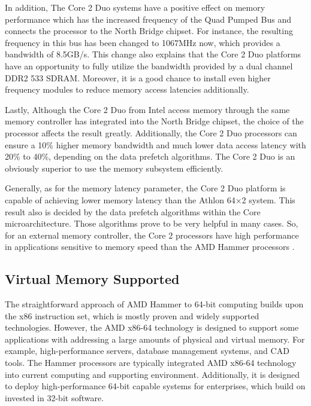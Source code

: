 \documentclass[letterpaper,10pt,compsoc,draftclsnofoot,onecolumn]{IEEEtran}
\begin{document}
In addition, The Core 2 Duo systems have a positive effect on memory performance which has the increased frequency of the Quad Pumped Bus\cite{pdf_amd_mem} and connects the processor to the North Bridge chipset. For instance, the resulting frequency in this bus has been changed to 1067MHz now, which provides a bandwidth of 8.5GB/s. This change also explains that the Core 2 Duo platforms have an opportunity to fully utilize the bandwidth provided by a dual channel DDR2 533 SDRAM. Moreover, it is a good chance to install even higher frequency modules to reduce memory access latencies additionally.

Lastly, Although the Core 2 Duo from Intel access memory through the same memory controller has integrated into the North Bridge chipset, the choice of the processor affects the result greatly. Additionally, the Core 2 Duo processors can ensure a 10\% higher memory bandwidth and much lower data access latency with 20\% to 40\%\cite{pdf_amd_mem}, depending on the data prefetch algorithms. The Core 2 Duo is an obviously superior to use the memory subsystem efficiently.

Generally, as for the memory latency parameter, the Core 2 Duo platform is capable of achieving lower memory latency than the Athlon 64×2 system. This result also is decided by the data prefetch algorithms within the Core microarchitecture. Those algorithms prove to be very helpful in many cases. So, for an external memory controller, the Core 2 processors have high performance in applications sensitive to memory speed than the AMD Hammer processors .

\subsection{Virtual Memory Supported}
The straightforward approach of AMD Hammer to 64-bit computing builds upon the x86 instruction set, which is mostly proven and widely supported technologies. However, the AMD x86-64 technology is designed to support some applications with addressing a large amounts of physical and virtual memory. For example, high-performance servers, database management systems, and CAD tools\cite{pdf_amd_mem}. The Hammer processors are typically integrated AMD x86-64 technology into current computing and supporting environment. Additionally, it is designed to deploy high-performance 64-bit capable systems for enterprises, which build on invested in 32-bit software.
\end{document}
